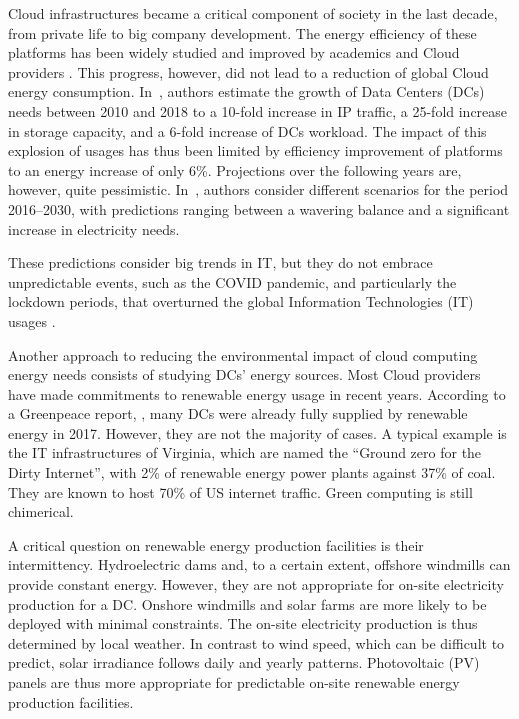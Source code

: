 
Cloud infrastructures became a critical component of society in the
last decade, from private life to big company development. The energy
efficiency of these platforms has been widely studied and improved by
academics and Cloud providers \cite{muralidhar2020energy}. This
progress, however, did not lead to a reduction of global Cloud energy
consumption. In~\cite{masanet2020recalibrating}, authors estimate the
growth of Data Centers (DCs) needs between 2010 and 2018 to a 10-fold
increase in IP traffic, a 25-fold increase in storage capacity, and a
6-fold increase of DCs workload. The impact of this explosion of
usages has thus been limited by efficiency improvement of platforms to
an energy increase of only 6\%. Projections over the following years
are, however, quite pessimistic. In~\cite{koot2021usage}, authors
consider different scenarios for the period 2016--2030, with
predictions ranging between a wavering balance and a significant
increase in electricity needs.


These predictions consider big trends in IT, but they do not embrace
unpredictable events, such as the COVID pandemic, and particularly the
lockdown periods, that overturned the global Information Technologies
(IT) usages \cite{feldmann2021implications}.


Another approach to reducing the environmental impact of cloud
computing energy needs consists of studying DCs' energy sources. Most
Cloud providers have made commitments to renewable energy usage in
recent years. According to a Greenpeace report, \cite{greenpeace2017},
many DCs were already fully supplied by renewable energy in
2017. However, they are not the majority of cases. A typical example
is the IT infrastructures of Virginia, which are named the ``Ground
zero for the Dirty Internet'', with 2\% of renewable energy power
plants against 37\% of coal. They are known to host 70\% of US
internet traffic. Green computing is still chimerical.


A critical question on renewable energy production facilities is their
intermittency. Hydroelectric dams and, to a certain extent, offshore
windmills can provide constant energy. However, they are not
appropriate for on-site electricity production for a DC. Onshore
windmills and solar farms are more likely to be deployed with minimal
constraints. The on-site electricity production is thus determined by
local weather. In contrast to wind speed, which can be difficult to
predict, solar irradiance follows daily and yearly
patterns. Photovoltaic (PV) panels are thus more appropriate for
predictable on-site renewable energy production facilities.




